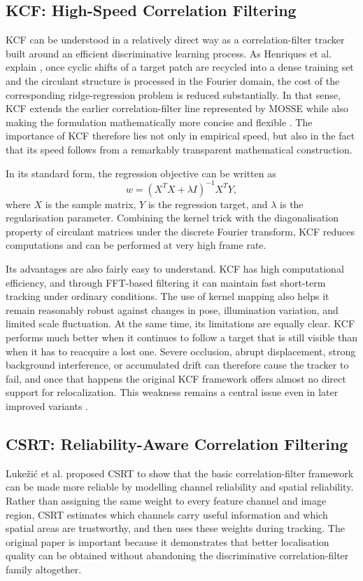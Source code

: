 \documentclass[12pt,a4paper]{article}
\begin{document}
\subsection{KCF: High-Speed Correlation Filtering}
KCF can be understood in a relatively direct way as a correlation-filter tracker built around an efficient discriminative learning process. As Henriques et al. explain \cite{henriques2015kcf}, once cyclic shifts of a target patch are recycled into a dense training set and the circulant structure is processed in the Fourier domain, the cost of the corresponding ridge-regression problem is reduced substantially. In that sense, KCF extends the earlier correlation-filter line represented by MOSSE while also making the formulation mathematically more concise and flexible \cite{bolme2010mosse}. The importance of KCF therefore lies not only in empirical speed, but also in the fact that its speed follows from a remarkably transparent mathematical construction.

In its standard form, the regression objective can be written as
\[
w = (X^TX + \lambda I)^{-1}X^TY,
\]
where $X$ is the sample matrix, $Y$ is the regression target, and $\lambda$ is the regularisation parameter. Combining the kernel trick with the diagonalisation property of circulant matrices under the discrete Fourier transform, KCF reduces computations and can be performed at very high frame rate.

Its advantages are also fairly easy to understand. KCF has high computational efficiency, and through FFT-based filtering it can maintain fast short-term tracking under ordinary conditions. The use of kernel mapping also helps it remain reasonably robust against changes in pose, illumination variation, and limited scale fluctuation. At the same time, its limitations are equally clear. KCF performs much better when it continues to follow a target that is still visible than when it has to reacquire a lost one. Severe occlusion, abrupt displacement, strong background interference, or accumulated drift can therefore cause the tracker to fail, and once that happens the original KCF framework offers almost no direct support for relocalization. This weakness remains a central issue even in later improved variants \cite{wang2018scale,tang2023siamkcf,chen2023improvedkcf,zhang2017cnnkcf}.

\subsection{CSRT: Reliability-Aware Correlation Filtering}
Luke\v{z}i\'c et al. \cite{lukezic2017csrt} proposed CSRT to show that the basic correlation-filter framework can be made more reliable by modelling channel reliability and spatial reliability. Rather than assigning the same weight to every feature channel and image region, CSRT estimates which channels carry useful information and which spatial areas are trustworthy, and then uses these weights during tracking. The original paper is important because it demonstrates that better localisation quality can be obtained without abandoning the discriminative correlation-filter family altogether.
\end{document}
